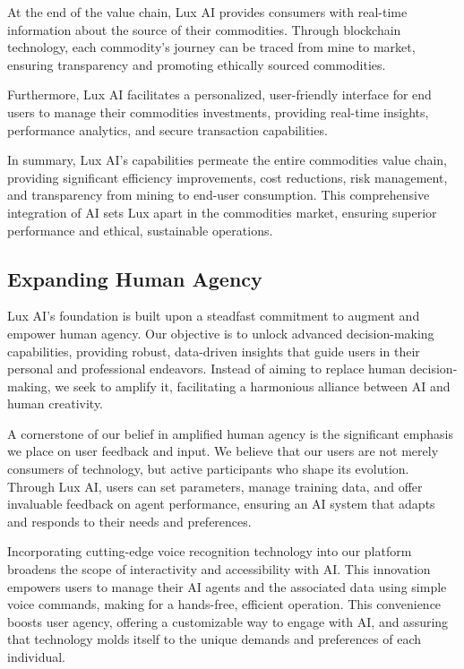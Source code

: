 \documentclass[11pt]{article}
\begin{document}
At the end of the value chain, Lux AI provides consumers with real-time information about the source of their commodities. Through blockchain technology, each commodity's journey can be traced from mine to market, ensuring transparency and promoting ethically sourced commodities.


Furthermore, Lux AI facilitates a personalized, user-friendly interface for end users to manage their commodities investments, providing real-time insights, performance analytics, and secure transaction capabilities.


In summary, Lux AI's capabilities permeate the entire commodities value chain, providing significant efficiency improvements, cost reductions, risk management, and transparency from mining to end-user consumption. This comprehensive integration of AI sets Lux apart in the commodities market, ensuring superior performance and ethical, sustainable operations.


\subsection{Expanding Human Agency}

Lux AI's foundation is built upon a steadfast commitment to augment and empower human agency. Our objective is to unlock advanced decision-making capabilities, providing robust, data-driven insights that guide users in their personal and professional endeavors. Instead of aiming to replace human decision-making, we seek to amplify it, facilitating a harmonious alliance between AI and human creativity.


A cornerstone of our belief in amplified human agency is the significant emphasis we place on user feedback and input. We believe that our users are not merely consumers of technology, but active participants who shape its evolution. Through Lux AI, users can set parameters, manage training data, and offer invaluable feedback on agent performance, ensuring an AI system that adapts and responds to their needs and preferences.


Incorporating cutting-edge voice recognition technology into our platform broadens the scope of interactivity and accessibility with AI. This innovation empowers users to manage their AI agents and the associated data using simple voice commands, making for a hands-free, efficient operation. This convenience boosts user agency, offering a customizable way to engage with AI, and assuring that technology molds itself to the unique demands and preferences of each individual.
\end{document}

